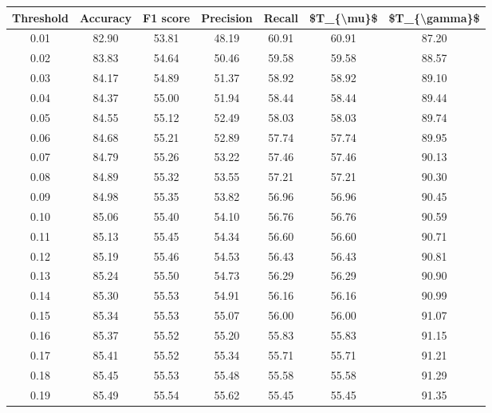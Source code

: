 \begin{tabular}{|c|c|c|c|c|c|c|}
\hline
 Threshold &  Accuracy &  F1 score &  Precision &  Recall &  \$T\_\{\textbackslash mu\}\$ &  \$T\_\{\textbackslash gamma\}\$ \\
\hline
      0.01 &     82.90 &     53.81 &      48.19 &   60.91 &      60.91 &         87.20 \\
      0.02 &     83.83 &     54.64 &      50.46 &   59.58 &      59.58 &         88.57 \\
      0.03 &     84.17 &     54.89 &      51.37 &   58.92 &      58.92 &         89.10 \\
      0.04 &     84.37 &     55.00 &      51.94 &   58.44 &      58.44 &         89.44 \\
      0.05 &     84.55 &     55.12 &      52.49 &   58.03 &      58.03 &         89.74 \\
      0.06 &     84.68 &     55.21 &      52.89 &   57.74 &      57.74 &         89.95 \\
      0.07 &     84.79 &     55.26 &      53.22 &   57.46 &      57.46 &         90.13 \\
      0.08 &     84.89 &     55.32 &      53.55 &   57.21 &      57.21 &         90.30 \\
      0.09 &     84.98 &     55.35 &      53.82 &   56.96 &      56.96 &         90.45 \\
      0.10 &     85.06 &     55.40 &      54.10 &   56.76 &      56.76 &         90.59 \\
      0.11 &     85.13 &     55.45 &      54.34 &   56.60 &      56.60 &         90.71 \\
      0.12 &     85.19 &     55.46 &      54.53 &   56.43 &      56.43 &         90.81 \\
      0.13 &     85.24 &     55.50 &      54.73 &   56.29 &      56.29 &         90.90 \\
      0.14 &     85.30 &     55.53 &      54.91 &   56.16 &      56.16 &         90.99 \\
      0.15 &     85.34 &     55.53 &      55.07 &   56.00 &      56.00 &         91.07 \\
      0.16 &     85.37 &     55.52 &      55.20 &   55.83 &      55.83 &         91.15 \\
      0.17 &     85.41 &     55.52 &      55.34 &   55.71 &      55.71 &         91.21 \\
      0.18 &     85.45 &     55.53 &      55.48 &   55.58 &      55.58 &         91.29 \\
      0.19 &     85.49 &     55.54 &      55.62 &   55.45 &      55.45 &         91.35 \\

\end{tabular}
